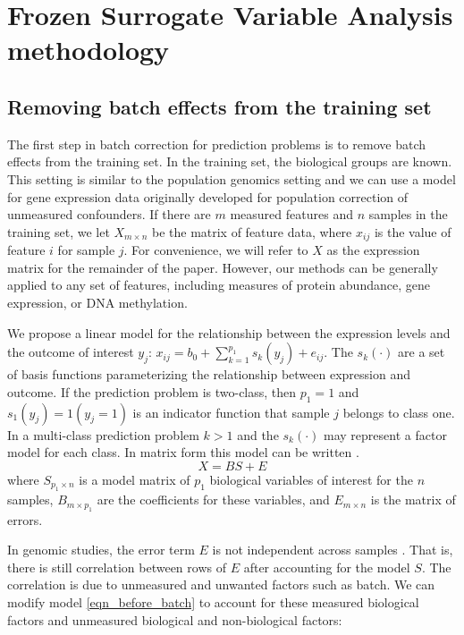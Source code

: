 \documentclass[letterpaper,12pt]{article}\usepackage[]{graphicx}\usepackage[]{color}
\begin{document}
\section{Frozen Surrogate Variable Analysis methodology}

\subsection{Removing batch effects from the training set}
The first step in batch correction for prediction problems is to remove batch effects from the training set. In the training set, the biological groups are known. This setting is similar to the population genomics setting and we can use a model for gene expression data originally developed for population correction of unmeasured confounders. If there are $m$ measured features and $n$ samples in the training set, we let $X_{m \times n}$ be the matrix of feature data, where $x_{ij}$ is the value of feature $i$ for sample $j$. For convenience, we will refer to $X$ as the expression matrix for the remainder of the paper. However, our methods can be generally applied to any set of features, including measures of protein abundance, gene expression, or DNA methylation. 

We propose a linear model for the relationship between the expression levels and the outcome of interest $y_j$: $x_{ij} = b_0 + \sum_{k=1}^{p_1} s_k(y_j) + e_{ij}$. The $s_k(\cdot)$ are a set of basis functions parameterizing the relationship between expression and outcome. If the prediction problem is two-class, then $p_1 =1$ and $s_1(y_j) = 1(y_j = 1)$ is an indicator function that sample $j$ belongs to class one. In a multi-class prediction problem $k > 1$ and the $s_k(\cdot)$ may represent a factor model for each class. In matrix form this model can be written \citep{Leek2007,Leek2008}. 
\begin{equation}
X = BS + E
\label{eqn_before_batch}
\end{equation}
where $S_{p_1 \times n}$ is a model matrix of $p_1$ biological variables of interest for the $n$ samples, $B_{m \times p_1}$ are the coefficients for these variables, and  $E_{m \times n}$ is the matrix of errors. 

In genomic studies, the error term $E$ is not independent across samples \citep{Johnson2007b,Leek2007,Leek2008,Walker2008,Friguet2009,Leek2010,Gagnon-Bartsch2011}.  That is, there is still correlation between rows of $E$ after accounting for the model $S$. The correlation is due to unmeasured and unwanted factors such as batch. We can modify model \ref{eqn_before_batch} to account for these measured biological factors and unmeasured biological and non-biological factors:
\end{document}
